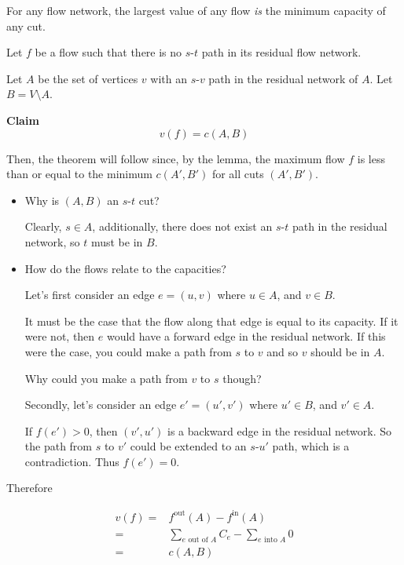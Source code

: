 \documentclass[12pt]{article}
\begin{document}
  {
    For any flow network, the largest value of any flow {\it is} the minimum
    capacity of any cut.
  }
  {
    Let $f$ be a flow such that there is no $s$-$t$ path in its residual flow
    network.


    Let $A$ be the set of vertices $v$ with an $s$-$v$ path in the residual
    network of $A$. Let $B = V \setminus A$.

    {\bf Claim}
    \[
      v(f) = c(A, B)
    \]

    Then, the theorem will follow since, by the lemma, the maximum flow $f$ is
    less than or equal to the minimum $c(A', B')$ for all cuts $(A', B')$.

    \begin{itemize}
      \item Why is $(A, B)$ an $s$-$t$ cut?

        Clearly, $s \in A$, additionally, there does not exist an $s$-$t$ path
        in the residual network, so $t$ must be in $B$.

      \item How do the flows relate to the capacities?

        Let's first consider an edge $e = (u, v)$ where $u \in A$, and $v \in
        B$.

        It must be the case that the flow along that edge is equal to its
        capacity. If it were not, then $e$ would have a forward edge in the
        residual network. If this were the case, you could make a path from $s$
        to $v$ and so $v$ should be in $A$.

        \QUESTION{} Why could you make a path from $v$ to $s$ though?

        Secondly, let's consider an edge $e' = (u', v')$ where $u' \in B$, and
        $v' \in A$.

        If $f(e') > 0$, then $(v', u')$ is a backward edge in the residual
        network. So the path from $s$ to $v'$ could be extended to an $s$-$u'$
        path, which is a contradiction. Thus $f(e') = 0$.
    \end{itemize}

    Therefore

    \begin{align*}
      v(f) =&f^\text{out}(A) - f^\text{in}(A) \\
      =&\sum_{e \text{ out of } A} C_e - \sum_{e \text{ into } A} 0 \\
      =&c(A, B)
    \end{align*}
  }
\end{document}
